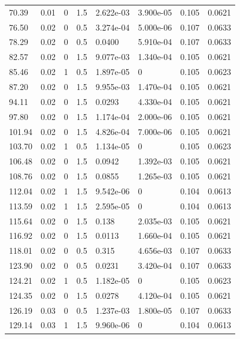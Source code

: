\documentclass[preview]{standalone}
\begin{document}
{{\begin{tabular}{L{1.2cm}C{1.2cm} C{0.3cm}C{0.5cm} C{1.4cm}C{1.4cm} C{1.4cm}C{1.4cm}}
  70.39  &  0.01  & 0     & 1.5 &  2.622e-03  & 3.900e-05  & 0.105 &  0.0621   \\ 
  76.50  &  0.02  & 0     & 0.5 &  3.274e-04  & 5.000e-06  & 0.107 &  0.0633   \\ 
  78.29  &  0.02  & 0     & 0.5 &  0.0400  & 5.910e-04  & 0.107 &  0.0633   \\ 
  82.57  &  0.02  & 0     & 1.5 &  9.077e-03  & 1.340e-04  & 0.105 &  0.0621   \\ 
  85.46  &  0.02  & 1     & 0.5 &  1.897e-05  & 0  & 0.105 &  0.0623   \\ 
  87.20  &  0.02  & 0     & 1.5 &  9.955e-03  & 1.470e-04  & 0.105 &  0.0621   \\ 
  94.11  &  0.02  & 0     & 1.5 &  0.0293  & 4.330e-04  & 0.105 &  0.0621   \\ 
  97.80  &  0.02  & 0     & 1.5 &  1.174e-04  & 2.000e-06  & 0.105 &  0.0621   \\ 
  101.94  &  0.02  & 0     & 1.5 &  4.826e-04  & 7.000e-06  & 0.105 &  0.0621   \\ 
  103.70  &  0.02  & 1     & 0.5 &  1.134e-05  & 0  & 0.105 &  0.0623   \\ 
  106.48  &  0.02  & 0     & 1.5 &  0.0942  & 1.392e-03  & 0.105 &  0.0621   \\ 
  108.76  &  0.02  & 0     & 1.5 &  0.0855  & 1.265e-03  & 0.105 &  0.0621   \\ 
  112.04  &  0.02  & 1     & 1.5 &  9.542e-06  & 0  & 0.104 &  0.0613   \\ 
  113.59  &  0.02  & 1     & 1.5 &  2.595e-05  & 0  & 0.104 &  0.0613   \\ 
  115.64  &  0.02  & 0     & 1.5 &  0.138  & 2.035e-03  & 0.105 &  0.0621   \\ 
  116.92  &  0.02  & 0     & 1.5 &  0.0113  & 1.660e-04  & 0.105 &  0.0621   \\ 
  118.01  &  0.02  & 0     & 0.5 &  0.315  & 4.656e-03  & 0.107 &  0.0633   \\ 
  123.90  &  0.02  & 0     & 0.5 &  0.0231  & 3.420e-04  & 0.107 &  0.0633   \\ 
  124.21  &  0.02  & 1     & 0.5 &  1.182e-05  & 0  & 0.105 &  0.0623   \\ 
  124.35  &  0.02  & 0     & 1.5 &  0.0278  & 4.120e-04  & 0.105 &  0.0621   \\ 
  126.19  &  0.03  & 0     & 0.5 &  1.237e-03  & 1.800e-05  & 0.107 &  0.0633   \\ 
  129.14  &  0.03  & 1     & 1.5 &  9.960e-06  & 0  & 0.104 &  0.0613   \\ 

\end{tabular}}}
\end{document}
